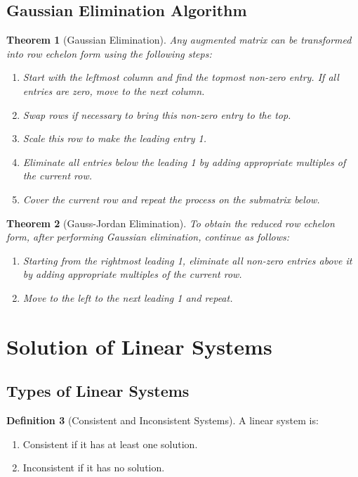 \documentclass[12pt,a4paper]{article}
\theoremstyle{plain}
\newtheorem{theorem}{Theorem}[section]
\theoremstyle{definition}
\newtheorem{definition}[theorem]{Definition}
\begin{document}
\subsection{Gaussian Elimination Algorithm}

\begin{theorem}[Gaussian Elimination]
Any augmented matrix can be transformed into row echelon form using the following steps:
\begin{enumerate}[label=(\arabic*)]
\item Start with the leftmost column and find the topmost non-zero entry. If all entries are zero, move to the next column.
\item Swap rows if necessary to bring this non-zero entry to the top.
\item Scale this row to make the leading entry 1.
\item Eliminate all entries below the leading 1 by adding appropriate multiples of the current row.
\item Cover the current row and repeat the process on the submatrix below.
\end{enumerate}
\end{theorem}

\begin{theorem}[Gauss-Jordan Elimination]
To obtain the reduced row echelon form, after performing Gaussian elimination, continue as follows:
\begin{enumerate}[label=(\arabic*)]
\item Starting from the rightmost leading 1, eliminate all non-zero entries above it by adding appropriate multiples of the current row.
\item Move to the left to the next leading 1 and repeat.
\end{enumerate}
\end{theorem}

\section{Solution of Linear Systems}

\subsection{Types of Linear Systems}

\begin{definition}[Consistent and Inconsistent Systems]
A linear system is:
\begin{enumerate}[label=(\roman*)]
\item Consistent if it has at least one solution.
\item Inconsistent if it has no solution.
\end{enumerate}
\end{definition}
\end{document}
